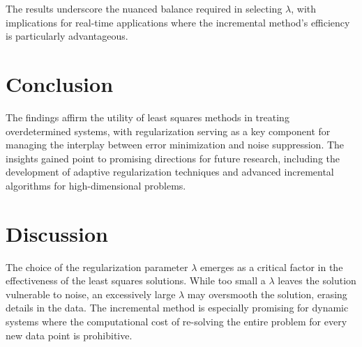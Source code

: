 \documentclass{article}
\begin{document}
The results underscore the nuanced balance required in selecting $\lambda$, with implications for real-time applications where the incremental method's efficiency is particularly advantageous.

\section{Conclusion}
The findings affirm the utility of least squares methods in treating overdetermined systems, with regularization serving as a key component for managing the interplay between error minimization and noise suppression. The insights gained point to promising directions for future research, including the development of adaptive regularization techniques and advanced incremental algorithms for high-dimensional problems.

\section{Discussion}
The choice of the regularization parameter $\lambda$ emerges as a critical factor in the effectiveness of the least squares solutions. While too small a $\lambda$ leaves the solution vulnerable to noise, an excessively large $\lambda$ may oversmooth the solution, erasing details in the data. The incremental method is especially promising for dynamic systems where the computational cost of re-solving the entire problem for every new data point is prohibitive.
\end{document}
